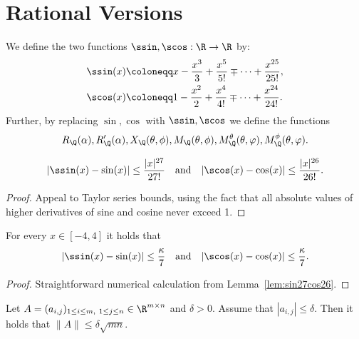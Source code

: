 \chapter{Rational Versions}

\begin{definition} \label{dfn:sin_cos_approx}
\leanok
{}
    We define the two functions $\ssin, \scos: \R \to \R$ by:
    \begin{align*}
    \ssin(x) & \coloneqq x-\frac{x^3}{3}+\frac{x^5}{5!}\mp \dots +\frac{x^{25}}{25!},\\
    \scos(x) & \coloneqq 1-\frac{x^2}{2}+\frac{x^4}{4!}\mp\dots +\frac{x^{24}}{24!}.
    \end{align*}
    Further, by replacing $\sin,\cos$ with $\ssin,\scos$ we define the functions
\[
    R_{\Q}(\alpha), R'_{\Q}(\alpha), X_{\Q}(\theta, \phi), M_{\Q}(\theta, \phi), M_{\Q}^{\theta}(\theta,\varphi),M_{\Q}^{\phi}(\theta,\varphi).
\]
\end{definition}

\begin{lemma} \label{lem:sin27cos26}
\leanok
{}
    \[
        |\ssin(x)-\sin(x)|\leq \frac{|x|^{27}}{27!} \quad \text{and} \quad
    |\scos(x)-\cos(x)|\leq \frac{|x|^{26}}{26!}.
    \]
\end{lemma}
\begin{proof}
\leanok
Appeal to Taylor series bounds, using the fact that all absolute values of
higher derivatives of sine and cosine never exceed 1.
\end{proof}

\begin{lemma} \label{lem:kappa7}
\leanok
{}
    For every $x\in [-4,4]$ it holds that
    \[
    |\ssin(x)-\sin(x)| \leq \frac{\kappa}{7} \quad \text{and} \quad |\scos(x)-\cos(x)|\leq \frac{\kappa}{7}.
    \]
\end{lemma}
\begin{proof}
\leanok
Straightforward numerical calculation from Lemma~\ref{lem:sin27cos26}.
\end{proof}

\begin{lemma} \label{lem:A_le_deltamn}
  \leanok
Let $A = (a_{i,j})_{1 \leq i \leq m,\ 1 \leq j \leq n} \in \R^{m \times n}$ and $\delta >0$. Assume that $|a_{i,j}| \leq \delta$. Then it holds that $\|A\| \leq \delta \sqrt{mn}.$
\end{lemma}

